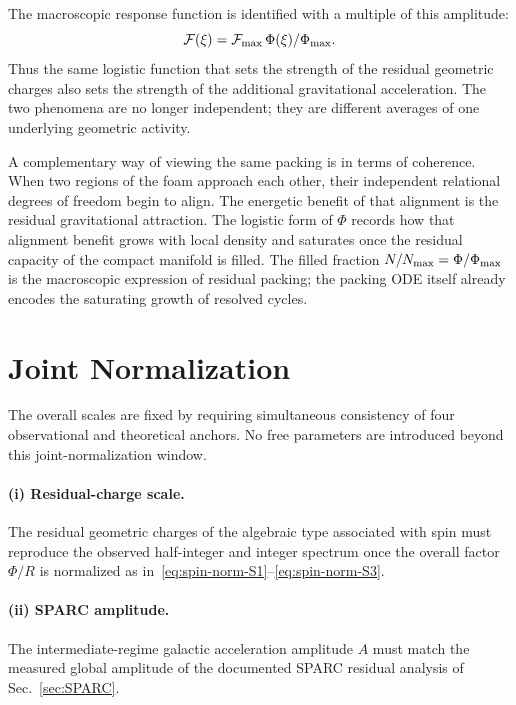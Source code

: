 \documentclass[11pt,a4paper]{article}
\begin{document}
The macroscopic response function is identified with a multiple of this amplitude:
\begin{equation}
\mathcal{F}(\xi)=\mathcal{F}_{\rm max}\,\Phi(\xi)/\Phi_{\rm max}.
\end{equation}
Thus the same logistic function that sets the strength of the residual geometric charges also sets the strength of the additional gravitational acceleration. The two phenomena are no longer independent; they are different averages of one underlying geometric activity.

A complementary way of viewing the same packing is in terms of coherence. When two regions of the foam approach each other, their independent relational degrees of freedom begin to align. The energetic benefit of that alignment is the residual gravitational attraction. The logistic form of \(\Phi\) records how that alignment benefit grows with local density and saturates once the residual capacity of the compact manifold is filled. The filled fraction \(N/N_{\rm max}=\Phi/\Phi_{\rm max}\) is the macroscopic expression of residual packing; the packing ODE itself already encodes the saturating growth of resolved cycles.

\section{Joint Normalization}
\label{sec:joint-norm}

The overall scales are fixed by requiring simultaneous consistency of four observational and theoretical anchors. No free parameters are introduced beyond this joint-normalization window.

\paragraph{(i) Residual-charge scale.}
The residual geometric charges of the algebraic type associated with spin must reproduce the observed half-integer and integer spectrum once the overall factor \(\Phi/R\) is normalized as in~\eqref{eq:spin-norm-S1}--\eqref{eq:spin-norm-S3}.

\paragraph{(ii) SPARC amplitude.}
The intermediate-regime galactic acceleration amplitude \(A\) must match the measured global amplitude of the documented SPARC residual analysis of Sec.~\ref{sec:SPARC}.
\end{document}
